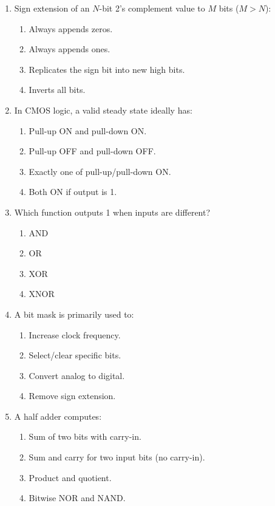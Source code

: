 \documentclass[11pt]{article}
\begin{document}
\begin{enumerate}[label=\textbf{A\arabic*.}]
  \item Sign extension of an $N$-bit 2's complement value to $M$ bits ($M>N$):
  \begin{enumerate}[label=(\Alph*)]
    \item Always appends zeros.
    \item Always appends ones.
    \item Replicates the sign bit into new high bits.
    \item Inverts all bits.
  \end{enumerate}

  \item In CMOS logic, a valid steady state ideally has:
  \begin{enumerate}[label=(\Alph*)]
    \item Pull-up ON and pull-down ON.
    \item Pull-up OFF and pull-down OFF.
    \item Exactly one of pull-up/pull-down ON.
    \item Both ON if output is 1.
  \end{enumerate}

  \item Which function outputs 1 when inputs are different?
  \begin{enumerate}[label=(\Alph*)]
    \item AND
    \item OR
    \item XOR
    \item XNOR
  \end{enumerate}

  \item A bit mask is primarily used to:
  \begin{enumerate}[label=(\Alph*)]
    \item Increase clock frequency.
    \item Select/clear specific bits.
    \item Convert analog to digital.
    \item Remove sign extension.
  \end{enumerate}

  \item A half adder computes:
  \begin{enumerate}[label=(\Alph*)]
    \item Sum of two bits with carry-in.
    \item Sum and carry for two input bits (no carry-in).
    \item Product and quotient.
    \item Bitwise NOR and NAND.
  \end{enumerate}
\end{enumerate}
\end{document}

